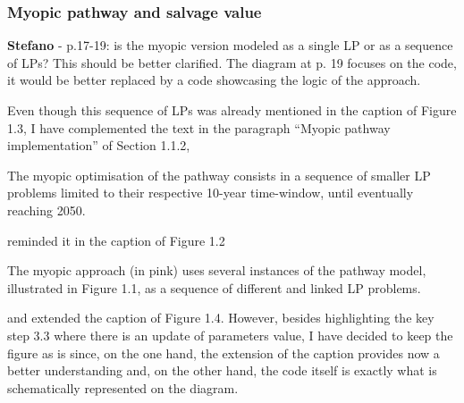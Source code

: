 \documentclass[12pt,a4paper]{article}
\begin{document}
\subsubsection{Myopic pathway and salvage value}

\begin{mdframed}[style=comment] %
{\color{orange} \textbf{Stefano}} - p.17-19: is the myopic version modeled as a single LP or as a sequence of LPs? This should be better clarified. The diagram at p. 19 focuses on the code, it would be better replaced by a code showcasing the logic of the approach.
\end{mdframed}

\noindent Even though this sequence of LPs was already mentioned {\color{blue}in the caption of Figure 1.3}, I have complemented the text {\color{blue} in the paragraph ``Myopic pathway implementation'' of Section 1.1.2}, 

\begin{mdframed}[style=manuscript] %
[...] The myopic optimisation of the pathway consists in a sequence of smaller LP problems limited to their respective 10-year time-window, until eventually reaching 2050.
\end{mdframed}

\noindent reminded it in the caption of Figure 1.2

\begin{mdframed}[style=manuscript] %
The myopic approach (in pink) uses several instances of the pathway model, illustrated in Figure 1.1, as a sequence of different and linked LP problems. 
\end{mdframed}

\noindent and extended the caption of {\color{blue} Figure 1.4}. However, besides highlighting the key step 3.3 where there is an update of parameters value, I have decided to keep the figure as is since, on the one hand, the extension of the caption provides now a better understanding and, on the other hand, the code itself is exactly what is schematically represented on the diagram. 
\end{document}
